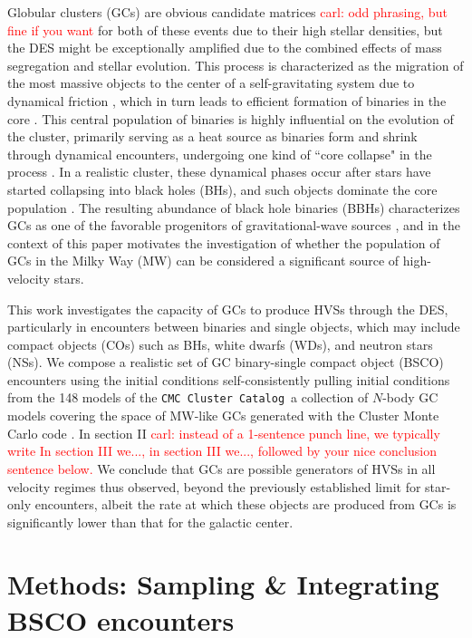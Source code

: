 \documentclass[twocolumn]{aastex631}
\newcommand{\CMCcat}{\texttt{CMC Cluster Catalog}}
\newcommand{\carl}[1]{\textcolor{red}{carl: #1}}
\begin{document}
Globular clusters (GCs) are obvious candidate matrices \carl{odd phrasing, but fine if you want} for both of these events due to their high stellar densities, but the DES might be exceptionally amplified due to the combined effects of mass segregation and stellar evolution.
This process is characterized as the migration of the most massive objects to the center of a self-gravitating system due to dynamical friction \citep[e.g.,][]{2008gady.book.....B}, which in turn leads to efficient formation of binaries in the core \citep{2005MNRAS.358..572I}.
This central population of binaries is highly influential on the evolution of the cluster, primarily serving as a heat source as binaries form and shrink through dynamical encounters, undergoing one kind of ``core collapse" in the process \citep[e.g.][]{2007ApJ...658.1047F, 2013MNRAS.429.2881C}.
In a realistic cluster, these dynamical phases occur after stars have started collapsing into black holes (BHs), and such objects dominate the core population \citep{2020IAUS..351..357K}.
The resulting abundance of black hole binaries (BBHs) characterizes GCs as one of the favorable progenitors of gravitational-wave sources \citep{2000ApJ...528L..17P, 2015PhRvL.115e1101R}, and in the context of this paper motivates the investigation of whether the population of GCs in the Milky Way (MW) can be considered a significant source of high-velocity stars.

This work investigates the capacity of GCs to produce HVSs through the DES, particularly in encounters between binaries and single objects, which may include compact objects (COs) such as BHs, white dwarfs (WDs), and neutron stars (NSs).
We compose a realistic set of GC binary-single compact object (BSCO) encounters using the initial conditions self-consistently pulling initial conditions from the 148 models of the \CMCcat\, a collection of $N$-body GC models covering the space of MW-like GCs \citep{2020ApJS..247...48K} generated with the Cluster Monte Carlo code \cite[\texttt{CMC}][]{Rodriguez2022}.  In section II \carl{instead of a 1-sentence punch line, we typically write In section III we..., in section III we..., followed by your nice conclusion sentence below.}
We conclude that GCs are possible generators of HVSs in all velocity regimes thus observed, beyond the previously established limit for star-only encounters, albeit the rate at which these objects are produced from GCs is significantly lower than that for the galactic center.

\section{Methods: Sampling \& Integrating BSCO encounters} \label{sec:methods}
\end{document}
